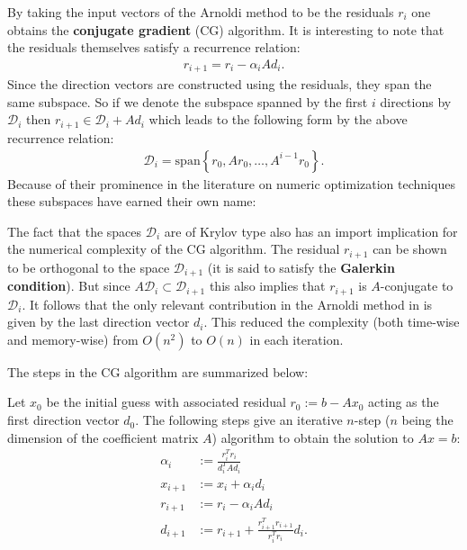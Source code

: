     By taking the input vectors of the Arnoldi method to be the residuals $r_i$ one obtains the \textbf{conjugate gradient} (CG) algorithm. It is interesting to note that the residuals themselves satisfy a recurrence relation:
    \begin{gather}
        r_{i+1} = r_i - \alpha_iAd_i.
    \end{gather}
    Since the direction vectors are constructed using the residuals, they span the same subspace. So if we denote the subspace spanned by the first $i$ directions by $\mathcal{D}_i$ then $r_{i+1}\in\mathcal{D}_i+Ad_i$ which leads to the following form by the above recurrence relation:
    \begin{gather}
        \mathcal{D}_i = \text{span}\left\{r_0,Ar_0,\ldots,A^{i-1}r_0\right\}.
    \end{gather}
    Because of their prominence in the literature on numeric optimization techniques these subspaces have earned their own name:

    The fact that the spaces $\mathcal{D}_i$ are of Krylov type also has an import implication for the numerical complexity of the CG algorithm. The residual $r_{i+1}$ can be shown to be orthogonal to the space $\mathcal{D}_{i+1}$ (it is said to satisfy the \textbf{Galerkin condition}). But since $A\mathcal{D}_i\subset\mathcal{D}_{i+1}$ this also implies that $r_{i+1}$ is $A$-conjugate to $\mathcal{D}_i$. It follows that the only relevant contribution in the Arnoldi method in is given by the last direction vector $d_i$. This reduced the complexity (both time-wise and memory-wise) from $O(n^2)$ to $O(n)$ in each iteration.

    The steps in the CG algorithm are summarized below:
    \begin{method}
        Let $x_0$ be the initial guess with associated residual $r_0:=b-Ax_0$ acting as the first direction vector $d_0$. The following steps give an iterative $n$-step ($n$ being the dimension of the coefficient matrix $A$) algorithm to obtain the solution to $Ax=b$:
        \begin{align}
            \alpha_i &:= \frac{r_i^Tr_i}{d_i^TAd_i}\\
            x_{i+1} &:= x_i+\alpha_id_i\\
            r_{i+1} &:= r_i-\alpha_iAd_i\label{data:residual_recurrence}\\
            d_{i+1} &:= r_{i+1}+\frac{r_{i+1}^Tr_{i+1}}{r_i^Tr_i}d_i.\label{data:beta}
        \end{align}
    \end{method}

